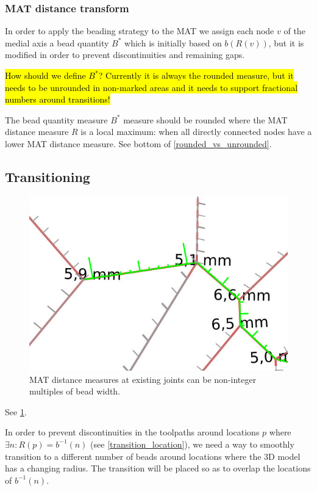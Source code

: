 \subsubsection{MAT distance transform}
In order to apply the beading strategy to the MAT
we assign each node $v$ of the medial axis a bead quantity $B^*$ which is initially based on $b(R(v))$, but it is modified in order to prevent discontinuities and remaining gaps.

\hl{How should we define $B^*$? Currently it is always the rounded measure, but it needs to be unrounded in non-marked areas and it needs to support fractional numbers around transitions!}

The bead quantity measure $B^*$ measure should be rounded
where the MAT distance measure $R$ is a local maximum: when all directly connected nodes have a lower MAT distance measure.
See bottom of \cref{rounded_vs_unrounded}.



\subsection{Transitioning}

\begin{figure}
\centering
\includegraphics[width=.6\columnwidth]{sources/method/rounded_dist_measures.jpg}
\caption{MAT distance measures at existing joints can be non-integer multiples of bead width.}
\label{rounded_dist_measures}
\end{figure}

See \cref{rounded_dist_measures}.

In order to prevent discontinuities in the toolpaths around locations $p$ where $\exists n : R(p) = b^{-1}(n)$ (see \cref{transition_location}), we need a way to smoothly transition to a different number of beads around locations where the 3D model has a changing radius.
The transition will be placed so as to overlap the locations of $b^{-1}(n)$.

